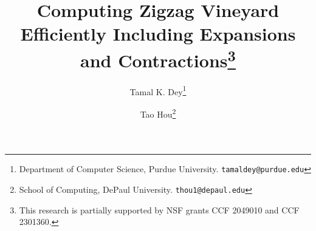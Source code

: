 \documentclass[letterpaper,11pt]{article}
\theoremstyle{mythmstyle}
\theoremstyle{mydefstyle}
\theoremstyle{plain}
\theoremstyle{definition}
\newcommand{\<}[1]{\langle #1\rangle}
\newcommand{\cancel}[1]
\begin{document}
\title{Computing Zigzag Vineyard Efficiently Including Expansions and Contractions\thanks{This research is partially supported by NSF grants CCF 2049010 and CCF 2301360.}}


\author{Tamal K. Dey\thanks{Department of Computer Science, Purdue University. \texttt{tamaldey@purdue.edu}}
\and Tao Hou\thanks{School of Computing, DePaul University. \texttt{thou1@depaul.edu}}
}

\date{}

\maketitle
\thispagestyle{empty}

\begin{abstract}
Vines and vineyard connecting a stack of persistence diagrams
have been introduced in the non-zigzag setting by 
Cohen-Steiner et al.~\cite{cohen2006vines}.
We consider
computing these vines over changing filtrations for zigzag persistence
while incorporating two more operations: expansions and contractions
in addition to the transpositions considered in the non-zigzag setting. 
Although expansions and contractions can be implemented in quadratic time in the non-zigzag case 
by utilizing the linear-time transpositions, 
it is not obvious how they can be carried out under the zigzag framework
with the same complexity. 
While transpositions 
alone can be easily conducted in linear time using the recent {\sc FastZigzag} algorithm~\cite{dey2022fast},
expansions and contractions pose difficulty in 
breaking the barrier of  cubic complexity~\cite{dey2021updating}. 
Our main result is that, 
the half-way constructed
up-down filtration in the {\sc FastZigzag} algorithm indeed can be used to achieve linear 
time complexity 
for transpositions and
quadratic time complexity for expansions and contractions, matching the time complexity of all
corresponding operations in the non-zigzag case.


\cancel{
We observe that eight atomic operations are sufficient for changing
one zigzag filtration to another and provide update
algorithms for each of them. Six of these operations that have
some 
analogues to one or multiple \emph{transpositions} in the non-zigzag case can be executed as efficiently
as their non-zigzag counterparts. This approach
takes advantage of a recently discovered algorithm for
computing zigzag barcodes~\cite{dey2022fast} by converting a zigzag filtration to a
non-zigzag one and then connecting barcodes of the two with a bijection. 
The remaining two atomic operations do not have a strict analogue in the non-zigzag case.
For them, we propose algorithms based on explicit maintenance of representatives (homology cycles) which can be useful in their own rights for applications requiring explicit updates of representatives.
}
\end{abstract}
\end{document}
